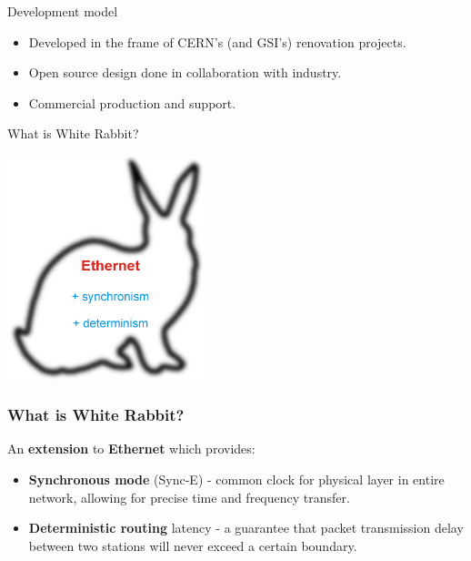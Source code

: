 \documentclass[compress,red]{beamer}
\begin{document}

\begin{frame}{Development model}
\begin{itemize}
\item Developed in the frame of CERN's (and GSI's) renovation projects.
\item Open source design done in collaboration with industry.
\item Commercial production and support.
\end{itemize}
\end{frame}

\begin{frame}{What is White Rabbit?}
\begin{center}
\includegraphics[height=6.5cm]{../../figures/misc/rabbit.pdf}
\end{center}
\end{frame}

\frame
{
  \frametitle{What is White Rabbit?}

\begin{block}{}
  An \textbf{extension} to \textbf{Ethernet} which provides:
  \begin{itemize}
  \item \textbf{Synchronous mode} (Sync-E) - common clock for physical layer in entire network, allowing for precise time and frequency transfer.

\item \textbf{Deterministic routing} latency - a guarantee that packet transmission delay between two stations will never exceed a certain boundary.
\end{itemize}
\end{block}

}
\end{document}
